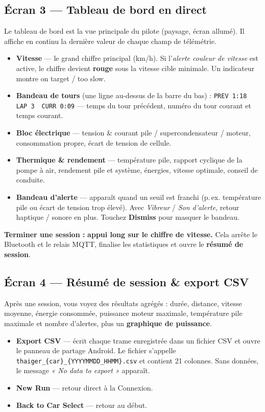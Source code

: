 \documentclass[11pt,a4paper,oneside]{report}
\newcommand{\midsep}{\,\textperiodcentered\,}
\newcommand{\ok}{\textcolor{tgreen}{\ding{51}}}
\newcommand{\nope}{\textcolor{tred}{\ding{55}}}
\newcommand{\code}[1]{\texttt{#1}}
\begin{document}
\subsection{Écran 3 --- Tableau de bord en direct}
Le tableau de bord est la vue principale du pilote (paysage, écran allumé). Il
affiche en continu la dernière valeur de chaque champ de télémétrie.
\begin{itemize}
  \item \textbf{Vitesse} --- le grand chiffre principal (km/h). Si l'\emph{alerte
    couleur de vitesse} est active, le chiffre devient \textbf{rouge} sous la
    vitesse cible minimale. Un indicateur montre \ok{} on target / \nope{} too slow.
  \item \textbf{Bandeau de tours} (une ligne au-dessus de la barre du bas) :
    \code{PREV 1:18} \midsep{} \code{LAP 3} \midsep{} \code{CURR 0:09} --- temps du
    tour précédent, numéro du tour courant et temps courant.
  \item \textbf{Bloc électrique} --- tension \& courant pile / supercondensateur /
    moteur, consommation propre, écart de tension de cellule.
  \item \textbf{Thermique \& rendement} --- température pile, rapport cyclique de la
    pompe à air, rendement pile et système, énergies, vitesse optimale, conseil de
    conduite.
  \item \textbf{Bandeau d'alerte} --- apparaît quand un seuil est franchi (p.\,ex.
    température pile ou écart de tension trop élevé). Avec \emph{Vibreur} /
    \emph{Son d'alerte}, retour haptique / sonore en plus. Touchez \textbf{Dismiss}
    pour masquer le bandeau.
\end{itemize}
\begin{tgnote}
\textbf{Terminer une session :} \textbf{appui long sur le chiffre de vitesse.} Cela
arrête le Bluetooth et le relais MQTT, finalise les statistiques et ouvre le
\textbf{résumé de session}.
\end{tgnote}

\subsection{Écran 4 --- Résumé de session \& export CSV}
Après une session, vous voyez des résultats agrégés : durée, distance, vitesse
moyenne, énergie consommée, puissance moteur maximale, température pile maximale et
nombre d'alertes, plus un \textbf{graphique de puissance}.
\begin{itemize}
  \item \textbf{Export CSV} --- écrit chaque trame enregistrée dans un fichier CSV
    et ouvre le panneau de partage Android. Le fichier s'appelle
    \code{thaiger\_\{car\}\_\allowbreak\{YYYYMMDD\_HHMM\}.csv} et contient 21
    colonnes. Sans données, le message \emph{« No data to export »} apparaît.
  \item \textbf{New Run} --- retour direct à la Connexion.
  \item \textbf{Back to Car Select} --- retour au début.
\end{itemize}
\end{document}
